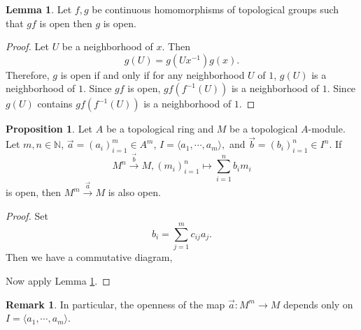 \documentclass[10pt]{article}
\numberwithin{equation}{section}
\theoremstyle{definition}
\newtheorem{proposition}{Proposition}[subsection]
\newtheorem{lemma}{Lemma}[subsection]
\newtheorem{remark}{Remark}[subsection]
\newcommand{\N}[0]{\mathbb{N}}
\begin{document}
\begin{lemma}
    Let $f,g$ be continuous homomorphisms of topological groups such that $gf$ is open then $g$ is open.
    \label{lemma_16_17_1}
\end{lemma}
\begin{proof}
    Let $U$ be a neighborhood of $x$. Then
    \begin{equation*}
    g(U) = g(Ux^{-1})g(x).
    \end{equation*}
    Therefore,  $g$ is open if and only if for any neighborhood $U$ of $1$, $g(U)$ is a neighborhood of $1$.
    Since $gf$ is open, $gf(f^{-1}(U))$ is a neighborhood of $1$. Since $g(U)$ contains $gf(f^{-1}(U))$ is a neighborhood of $1$.
\end{proof}

\begin{proposition}
    \label{fact_16_17}
    Let $A$ be a topological ring and $M$ be a topological $A$-module.
    Let $m,n\in\N$, $\vec{a} = (a_i)_{i=1}^m\in A^m$, $I= \langle a_1,\cdots,a_m\rangle,$ and $\vec{b} = (b_i)_{i=1}^n\in I^n$. If
    \begin{equation*}
        M^n\stackrel{\vec{b}}{\to}M, (m_i)_{i=1}^n\mapsto \sum_{i=1}^n b_im_i
    \end{equation*}
    is open, then $M^m\stackrel{\vec{a}}{\to}M$ is also open.
\end{proposition}
\begin{proof}
    Set
    \begin{equation*}
        b_i =\sum_{j=1}^m c_{ij}a_j.
    \end{equation*}
    Then we have a commutative diagram,
    \begin{center}
    \end{center}
    Now apply Lemma \ref{lemma_16_17_1}.
\end{proof}

\begin{remark}
    In particular, the openness of the map $\vec{a}:M^m\to M$ depends only on $I = \langle a_1,\cdots,a_m\rangle$.
\end{remark}
\end{document}
